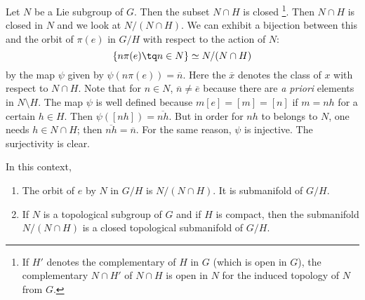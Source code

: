 Let $N$ be a Lie subgroup of $G$. Then the subset $N\cap H$ is closed
\footnote{If $H'$ denotes the complementary of $H$ in $G$ (which is open in $G$), the complementary $N\cap H'$ of $N\cap H$ is open in $N$ for the induced topology of $N$ from $G$.}. Then $N\cap H$ is closed in $N$ and we look at $N/(N\cap H)$. We can exhibit a bijection between this and the orbit of $\pi(e)$ in $G/H$ with respect to the action of $N$:
\begin{equation}
	\{ n\pi(e)\tq n\in N \}\simeq N/(N\cap H)
\end{equation}
by the map $\psi$ given by $\psi(n\pi(e))=\overline{n}$. Here the $\overline{ x }$ denotes the class of $x$ with respect to $N\cap H$. Note that for $n\in N$, $\overline{n}\neq\overline{e}$ because there are \emph{a priori} elements in $N\setminus H$. The map $\psi$ is well defined because $m[e]=[m]=[n]$ if $m=nh$ for a certain $h\in H$. Then $\psi([nh])=\overline{nh}$. But in order for $nh$ to belongs to $N$, one needs $h\in N\cap H$; then $\overline{nh}=\overline{n}$. For the same reason, $\psi$ is injective. The surjectivity is clear.

\begin{proposition}			\label{prop:orbit_N_ss_var}
	In this context,
	\begin{enumerate}
		\item The orbit of $e$ by $N$ in $G/H$ is $N/(N\cap H)$. It is submanifold of $G/H$.
		\item If $N$ is a topological subgroup of $G$ and if $H$ is compact, then the submanifold $N/(N\cap H)$ is a closed topological submanifold of $G/H$.
	\end{enumerate}
\end{proposition}

